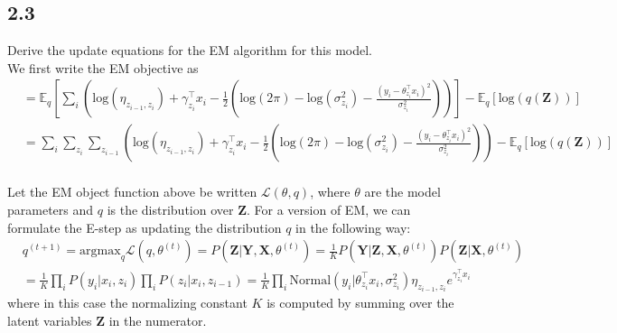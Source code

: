 \documentclass[12pt]{article}
\begin{document}
\subsection*{2.3}
Derive the update equations for the EM algorithm for this model.
\\

We first write the EM objective as
\begin{equation}
    \begin{split}
        &= \mathbb{E}_q \left[ \sum_i \left( \text{log}(\eta_{z_{i-1},z_i}) + \gamma_{z_i}^{\top} x_i 
             -\frac{1}{2}\left( \text{log}(2\pi) - \text{log}(\sigma_{z_i}^2) - \frac{(y_i - \theta_{z_i}^{\top} x_i)^2}{ \sigma_{z_i}^2} \right)  \right) \right]
             - \mathbb{E}_q \left[\text{log} \left( q(\textbf{Z}) \right) \right] \\
         &=  \sum_i \sum_{z_i} \sum_{z_{i-1}} \left( \text{log}(\eta_{z_{i-1},z_i}) + \gamma_{z_i}^{\top} x_i 
             -\frac{1}{2}\left( \text{log}(2\pi) - \text{log}(\sigma_{z_i}^2) - \frac{(y_i - \theta_{z_i}^{\top} x_i)^2}{ \sigma_{z_i}^2} \right)  \right)
             - \mathbb{E}_q \left[\text{log} \left( q(\textbf{Z}) \right) \right] \\
    \end{split}
\end{equation}

Let the EM object function above be written $\mathcal{L}(\theta,q)$, where $\theta$ are the model parameters and $q$ is the distribution over $\textbf{Z}$. For a version of EM, we can formulate the E-step as updating the distribution $q$ in the following way: 
\begin{equation}
    \begin{split}
        & q^{(t+1)} = \text{argmax}_q \mathcal{L}(q,\theta^{(t)}) = P(\textbf{Z} | \textbf{Y}, \textbf{X}, \theta^{(t)})
            = \frac{1}{K} P(\textbf{Y} | \textbf{Z}, \textbf{X}, \theta^{(t)}) P(\textbf{Z} | \textbf{X}, \theta^{(t)}) \\
        & = \frac{1}{K} \prod_i P(y_i | x_i, z_i) \prod_i P(z_i | x_i, z_{i-1})
            = \frac{1}{K} \prod_i \text{Normal}(y_i | \theta_{z_i}^{\top} x_i, \sigma_{z_i}^2)  
            \eta_{z_{i-1},z_i} e^{\gamma_{z_i}^{\top} x_i}
    \end{split}
\end{equation}
where in this case the normalizing constant $K$ is computed by summing over the latent variables $\textbf{Z}$ in the numerator.
\\
\end{document}
